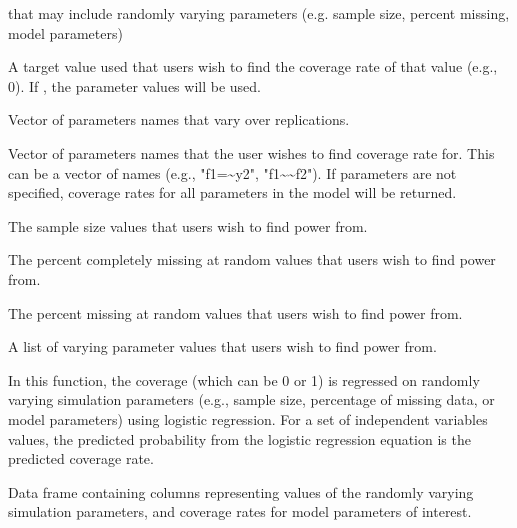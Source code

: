 \documentclass[a4paper]{book}
\begin{document}
%
\begin{Arguments}
\begin{ldescription}
\item[\code{simResult}] 
 that may include randomly varying parameters (e.g. sample size, percent missing, model parameters)

\item[\code{coverValue}] 
A target value used that users wish to find the coverage rate of that value (e.g., 0). If , the parameter values will be used.

\item[\code{contParam}] 
Vector of parameters names that vary over replications.

\item[\code{coverParam}] 
Vector of parameters names that the user wishes to find coverage rate for. This can be a vector of names (e.g., "f1=\textasciitilde{}y2", "f1\textasciitilde{}\textasciitilde{}f2"). If parameters are not specified, coverage rates for all parameters in the model will be returned.

\item[\code{nVal}] 
The sample size values that users wish to find power from.

\item[\code{pmMCARval}] 
The percent completely missing at random values that users wish to find power from.

\item[\code{pmMARval}] 
The percent missing at random values that users wish to find power from.

\item[\code{paramVal}] 
A list of varying parameter values that users wish to find power from.

\end{ldescription}
\end{Arguments}
%
\begin{Details}\relax
In this function, the coverage (which can be 0 or 1) is regressed on randomly varying simulation parameters (e.g., sample size, percentage of missing data, or model parameters) using logistic regression. For a set of independent variables values, the predicted probability from the logistic regression equation is the predicted coverage rate.
\end{Details}
%
\begin{Value}
Data frame containing columns representing values of the randomly varying simulation parameters, and coverage rates for model parameters of interest.
\end{Value}
\end{document}
